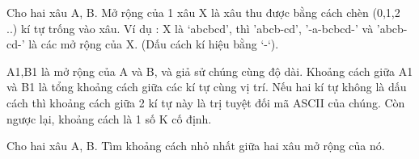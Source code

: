Cho hai xâu A, B.  Mở rộng của 1 xâu X là xâu thu được bằng cách chèn (0,1,2 ..) kí tự trống vào xâu.  Ví dụ :  X là ‘abcbcd’, thì 'abcb-cd', '-a-bcbcd-'  và 'abcb-cd-'  là các mở rộng của X. (Dấu cách kí hiệu bằng ‘-‘).  

   A1,B1 là mở rộng của A và B, và giả sử chúng cùng độ dài. Khoảng cách giữa  A1 và B1 là tổng khoảng cách giữa các kí tự cùng vị trí. Nếu hai kí tự  không là dấu cách thì khoảng cách giữa 2 kí tự này là trị tuyệt đối mã  ASCII của chúng. Còn ngược lại, khoảng cách là 1 số K cố định.  

   Cho hai xâu A, B. Tìm khoảng cách nhỏ nhất giữa hai xâu mở rộng của nó.  

\